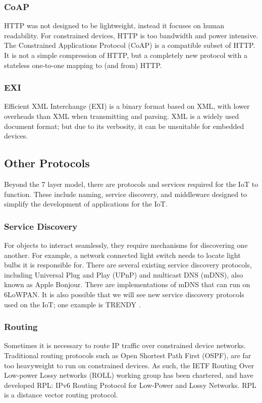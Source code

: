 \documentclass[10pt,journal,compsoc]{IEEEtran}
\begin{document}
\subsubsection{CoAP}
HTTP was not designed to be lightweight, instead it focuses on human
readability. For constrained devices, HTTP is too bandwidth and power
intensive. The Constrained Applications Protocol (CoAP) is a compatible subset
of HTTP. It is not a simple compression of HTTP, but a completely new protocol
with a stateless one-to-one mapping to (and from) HTTP. 

\subsubsection{EXI}
Efficient XML Interchange (EXI) is a binary format based on XML, with lower
overheads than XML when transmitting and parsing. XML is a widely used document
format; but due to its verbosity, it can be unsuitable for embedded devices. 

\subsection{Other Protocols} 
Beyond the 7 layer model, there are protocols and services required for the IoT
to function. These include naming, service discovery, and middleware designed
to simplify the development of applications for the IoT.

\subsubsection{Service Discovery}
For objects to interact seamlessly, they require mechanisms for discovering one
another. For example, a network connected light switch needs to locate light
bulbs it is responsible for. There are several existing service discovery
protocols, including Universal Plug and Play (UPnP) and multicast DNS (mDNS),
also known as Apple Bonjour. There are implementations of mDNS that can run on
6LoWPAN. It is also possible that we will see new service discovery protocols
used on the IoT; one example is TRENDY \cite{Butt2013}. 

\subsubsection{Routing}
Sometimes it is necessary to route IP traffic over constrained device networks.
Traditional routing protocols such as Open Shortest Path First (OSPF), are far
too heavyweight to run on constrained devices. As such, the IETF Routing Over
Low-power Lossy networks (ROLL) working group has been chartered, and have
developed RPL: IPv6 Routing Protocol for Low-Power and Lossy Networks. RPL is a
distance vector routing protocol.
\end{document}
